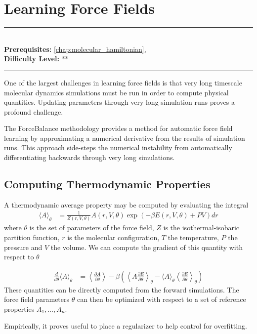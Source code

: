\documentclass[book.tex]{subfiles}
\begin{document}
\chapter{Learning Force Fields}
\label{chap:forcebalance}
\noindent\rule{11cm}{0.4pt} \\
\textbf{Prerequisites:}  \autoref{chap:molecular_hamiltonian},   \\
\textbf{Difficulty Level:} ** \\
\noindent\rule{11cm}{0.4pt}
\vspace{5mm}

One of the largest challenges in learning force fields is that very long timescale molecular dynamics simulations must be run in order to compute physical quantities. Updating parameters through very long simulation runs proves a profound challenge.

The ForceBalance methodology provides a method for automatic force field learning by approximating a numerical derivative from the results of simulation runs. This approach side-steps the numerical instability from automatically differentiating backwards through very long simulations.

\section{Computing Thermodynamic Properties}

A thermodynamic average property may be computed by evaluating the integral
\begin{align}
\langle A \rangle_\theta &= \frac{1}{Z(r, V, \theta)} A(r, V, \theta) \exp(-\beta E(r, V,\theta) + PV)dr
\end{align}
where $\theta$ is the set of parameters of the force field, $Z$ is the isothermal-isobaric partition function, $r$ is the molecular configuration, $T$ the temperature, $P$ the pressure and $V$ the volume. We can compute the gradient of this quantity with respect to $\theta$

\begin{align}
\frac{d}{d\theta} \langle A \rangle_\theta &= \left \langle \frac{\partial A}{\partial \theta} \right \rangle - \beta \left ( \left \langle A \frac{\partial E}{\partial \theta} \right \rangle_\theta - \langle A \rangle_\theta \left \langle \frac{\partial E}{\partial \theta} \right \rangle_\theta \right )
\end{align}
These quantities can be directly computed from the forward simulations. The force field parameters $\theta$ can then be optimized with respect to a set of reference properties $A_1,\dotsc,A_n$.

Empirically, it proves useful to place a regularizer to help control for overfitting.
\end{document}
